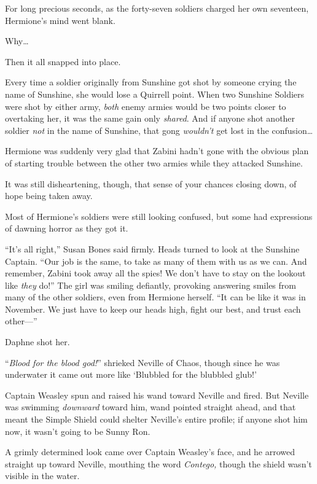 \later

For long precious seconds, as the forty-seven soldiers charged her own seventeen, Hermione’s mind went blank.

Why…

Then it all snapped into place.

Every time a soldier originally from Sunshine got shot by someone crying the name of Sunshine, she would lose a Quirrell point. When two Sunshine Soldiers were shot by either army, \emph{both} enemy armies would be two points closer to overtaking her, it was the same gain only \emph{shared}. And if anyone shot another soldier \emph{not} in the name of Sunshine, that gong \emph{wouldn’t} get lost in the confusion…

Hermione was suddenly very glad that Zabini hadn’t gone with the obvious plan of starting trouble between the other two armies while they attacked Sunshine.

It was still disheartening, though, that sense of your chances closing down, of hope being taken away.

Most of Hermione’s soldiers were still looking confused, but some had expressions of dawning horror as they got it.

“It’s all right,” Susan Bones said firmly. Heads turned to look at the Sunshine Captain.
“Our job is the same, to take as many of them with us as we can. And remember, Zabini took away all the spies! We don’t have to stay on the lookout like \emph{they} do!” The girl was smiling defiantly, provoking answering smiles from many of the other soldiers, even from Hermione herself.
“It can be like it was in November. We just have to keep our heads high, fight our best, and trust each other—”

Daphne shot her.

\later

“\emph{Blood for the blood god!}” shrieked Neville of Chaos, though since he was underwater it came out more like ‘Blubbled for the blubbled glub!’

Captain Weasley spun and raised his wand toward Neville and fired. But Neville was swimming \emph{downward} toward him, wand pointed straight ahead, and that meant the Simple Shield could shelter Neville’s entire profile; if anyone shot him now, it wasn’t going to be Sunny Ron.

A grimly determined look came over Captain Weasley’s face, and he arrowed straight up toward Neville, mouthing the word \emph{Contego,} though the shield wasn’t visible in the water.

